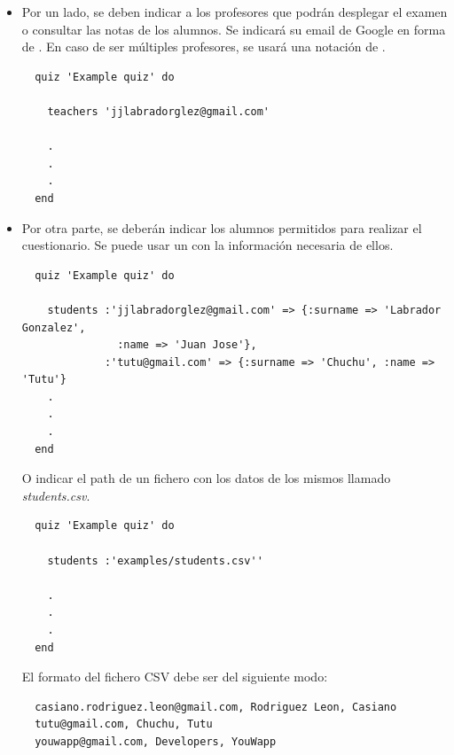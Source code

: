 \begin{itemize}
  \item Por un lado, se deben indicar a los profesores que podr\'an desplegar el examen o consultar las notas de los alumnos. Se indicar\'a
  su email de Google en forma de . En caso de ser m\'ultiples profesores, se usar\'a una notaci\'on de . 
  \begin{lstlisting}
  quiz 'Example quiz' do
    
    teachers 'jjlabradorglez@gmail.com'
    
    .
    .
    .
  end
  \end{lstlisting}
  
  \item Por otra parte, se deber\'an indicar los alumnos permitidos para realizar el cuestionario. Se puede usar un  con 
  la informaci\'on necesaria de ellos. 
  \begin{lstlisting}
  quiz 'Example quiz' do
    
    students :'jjlabradorglez@gmail.com' => {:surname => 'Labrador Gonzalez', 
               :name => 'Juan Jose'}, 
             :'tutu@gmail.com' => {:surname => 'Chuchu', :name => 'Tutu'}
    .
    .
    .
  end
  \end{lstlisting}
  
  O indicar el path de un fichero  con los datos de los mismos llamado \textit{students.csv}.
  \begin{lstlisting}
  quiz 'Example quiz' do
    
    students :'examples/students.csv''
    
    .
    .
    .
  end
  \end{lstlisting}
  
  El formato del fichero CSV debe ser del siguiente modo:
  \begin{verbatim}
  casiano.rodriguez.leon@gmail.com, Rodriguez Leon, Casiano
  tutu@gmail.com, Chuchu, Tutu
  youwapp@gmail.com, Developers, YouWapp
  \end{verbatim}
  
\end{itemize}

